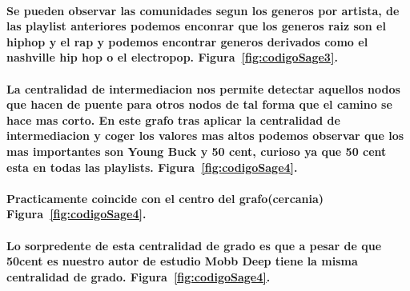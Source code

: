 \documentclass[11pt,spanish]{article}
\begin{document}
\paragraph*{Se pueden observar las comunidades segun los generos por artista, 
de las playlist anteriores podemos enconrar que los generos raiz son el hiphop y el rap
y podemos encontrar generos derivados como el nashville hip hop o el electropop. Figura~\ref{fig:codigoSage3}.}

\paragraph*{La centralidad de intermediacion nos permite detectar 
aquellos nodos que hacen de puente para otros nodos de tal forma que el camino se hace mas corto.
En este grafo tras aplicar la centralidad de intermediacion y coger los valores mas altos 
podemos observar que los mas importantes son Young Buck y 50 cent, 
curioso ya que 50 cent esta en todas las playlists. Figura~\ref{fig:codigoSage4}.}

\paragraph*{Practicamente coincide con el centro del grafo(cercania) Figura~\ref{fig:codigoSage4}.}

\paragraph*{Lo sorpredente de esta centralidad de grado es que a pesar de que 50cent es nuestro 
autor de estudio Mobb Deep tiene la misma centralidad de grado. Figura~\ref{fig:codigoSage4}.}
\end{document}
